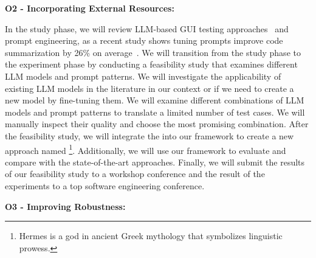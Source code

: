 

\bigskip
\noindent
\textbf{O2 - Incorporating External Resources:}  

\bigskip
\noindent
In the study phase, we will review LLM-based GUI testing approaches~\cite{Zimmermann:GPT3GUITest:2023:ICSTW, liu:GUIInputLLM:ICSE:2023} and prompt engineering, as a recent study shows tuning prompts improve code summarization  by 26\% on average~\cite{wang:prompt:FSE:2023}.
We will transition from the study phase to the experiment phase by conducting a feasibility study that examines different LLM models and prompt patterns.
We will investigate the applicability of existing LLM models in the literature in our context or if we need to create a new model by fine-tuning them.
We will examine different combinations of LLM models and prompt patterns to translate a limited number of test cases.
We will manually inspect their quality and choose the most promising combination.
After the feasibility study, we will integrate the \llmtranslator into our framework to create a new \testreuse approach named \llmtool\footnote{Hermes is a god in ancient Greek mythology that symbolizes linguistic prowess.}.
Additionally, we will use our \tme framework to evaluate \llmtool and compare with the state-of-the-art \testreuse approaches.
Finally, we will submit the results of our  feasibility study to a workshop conference and the result of the \testreuse experiments to a top software engineering conference. 




\bigskip
\noindent
\textbf{O3 - Improving Robustness:}  

